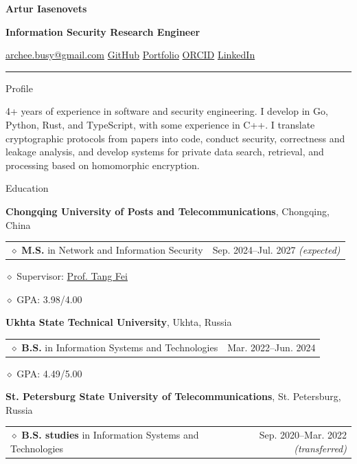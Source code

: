 \documentclass[11pt,a4paper]{article}
\makeatletter
\newcommand{\cvrow}[2]{%
  \noindent
  \begin{minipage}[t]{0.145\textwidth}
    \vspace{0pt}%
    \raggedright
    \fontsize{10.5}{12.5}\selectfont
    #1
  \end{minipage}%
  \hfill
  \begin{minipage}[t]{0.835\textwidth}
    \vspace{0pt}%
    #2
  \end{minipage}\par
}
\newcommand{\eduentry}[2]{%
  \noindent
  \begin{tabularx}{\linewidth}
    {@{}X@{\hspace{0.8em}}r@{}}
    #1 & \small #2
  \end{tabularx}\par
  \vspace{0.15em}
}
\newcommand{\edudetail}[1]{%
  \noindent\hspace*{1.15em}$\diamond$ #1\par
}
\makeatother
\begin{document}
{\fontsize{24}{28}\selectfont\bfseries Artur Iasenovets}\par
\vspace{0.08em}
{\large\bfseries Information Security Research Engineer}\par
\vspace{0.28em}
\href{mailto:archee.busy@gmail.com}{archee.busy@gmail.com}
\;\textbullet\;
\href{https://github.com/iasenovets}{GitHub}
\;\textbullet\;
\href{https://iasenovets.github.io/}{Portfolio}
\;\textbullet\;
\href{https://orcid.org/0009-0008-0008-3746}{ORCID}
\;\textbullet\;
\href{https://linkedin.com/in/iasenovets}{LinkedIn}
\par
\vspace{0.22em}
\hrule
\vspace{0.55em}

\cvrow{Profile}{%
  4+ years of experience in software and security engineering. I develop in Go,
  Python, Rust, and TypeScript, with some experience in C++.
  I translate cryptographic protocols from papers into code, conduct security,
  correctness and leakage analysis, and develop systems for private data search,
  retrieval, and processing based on homomorphic encryption.
}

\vspace{0.75em}

\cvrow{Education}{%
  \raggedright

  \textbf{Chongqing University of Posts and Telecommunications},
  Chongqing, China\par
  \vspace{0.12em}

  \eduentry
    {$\diamond$ \textbf{M.S.} in Network and Information Security}
    {Sep. 2024--Jul. 2027 \textit{(expected)}}

  \edudetail{Supervisor:
    \href{https://faculty.cqupt.edu.cn/tangfei/en/index.htm}{Prof. Tang Fei}}
  \edudetail{GPA: 3.98/4.00}

  \vspace{0.48em}

  \textbf{Ukhta State Technical University},
  Ukhta, Russia\par
  \vspace{0.12em}

  \eduentry
    {$\diamond$ \textbf{B.S.} in Information Systems and Technologies}
    {Mar. 2022--Jun. 2024}

  \edudetail{GPA: 4.49/5.00}

  \vspace{0.48em}

  \textbf{St. Petersburg State University of Telecommunications},
  St. Petersburg, Russia\par
  \vspace{0.12em}

  \eduentry
    {$\diamond$ \textbf{B.S. studies} in Information Systems and Technologies}
    {Sep. 2020--Mar. 2022 \textit{(transferred)}}
}
\end{document}
